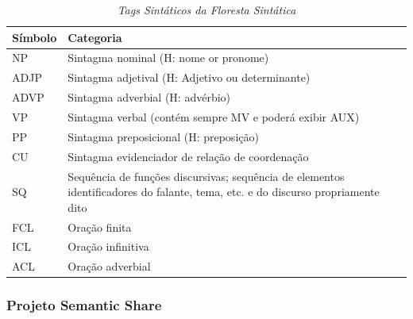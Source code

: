 \begin{table}
   \centering
   \small
   \caption{\it Tags Sintáticos da Floresta Sintática}
   

    \begin{tabular}{ | p{3cm} | p{10cm} | }
      \hline
        \textbf{Símbolo} & \textbf{Categoria}\\
        \hline
        \hline

            NP&Sintagma nominal
            (H: nome or pronome)\\
            \hline

            ADJP&Sintagma adjetival
            (H: Adjetivo ou determinante)\\
            \hline

            ADVP&Sintagma adverbial
            (H: advérbio)\\
            \hline

            VP&Sintagma verbal
            (contém sempre MV e poderá exibir AUX)\\
            \hline

            PP&Sintagma preposicional
            (H: preposição)\\
            \hline

            CU&Sintagma evidenciador de relação de coordenação\\
            \hline

            SQ&Sequência de funções discursivas; sequência de elementos identificadores do falante, tema, etc. e do discurso propriamente dito\\


            \hline

            FCL& Oração finita\\

            \hline

            ICL&Oração infinitiva\\

            \hline

            ACL&Oração adverbial\\

            \hline


   \end{tabular}
   \label{tbl:floresta_sintatica_cats}
\end{table}


\subsubsection{Projeto Semantic Share}
\label{sub:sub_semantic_corpus}

